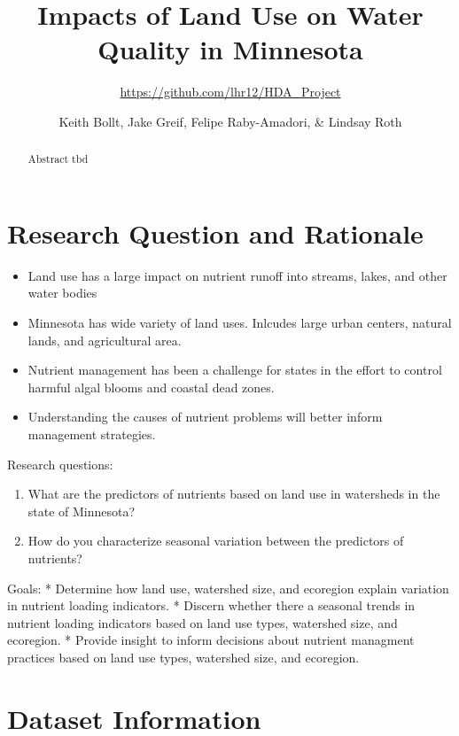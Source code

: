 \documentclass[12pt,]{article}
\title{Impacts of Land Use on Water Quality in Minnesota}
\subtitle{\url{https://github.com/lhr12/HDA_Project}}
\author{Keith Bollt, Jake Greif, Felipe Raby-Amadori, \& Lindsay Roth}
\date{}
\providecommand{\tightlist}{%
  \setlength{\itemsep}{0pt}\setlength{\parskip}{0pt}}
\begin{document}
\maketitle
\begin{abstract}
Abstract tbd
\end{abstract}

\newpage
\tableofcontents 
\newpage
\listoftables 
\newpage
\listoffigures 
\newpage

\hypertarget{research-question-and-rationale}{%
\section{Research Question and
Rationale}\label{research-question-and-rationale}}

\begin{itemize}
\tightlist
\item
  Land use has a large impact on nutrient runoff into streams, lakes,
  and other water bodies
\item
  Minnesota has wide variety of land uses. Inlcudes large urban centers,
  natural lands, and agricultural area.
\item
  Nutrient management has been a challenge for states in the effort to
  control harmful algal blooms and coastal dead zones.
\item
  Understanding the causes of nutrient problems will better inform
  management strategies.
\end{itemize}

Research questions:

\begin{enumerate}
\def\labelenumi{\arabic{enumi}.}
\item
  What are the predictors of nutrients based on land use in watersheds
  in the state of Minnesota?
\item
  How do you characterize seasonal variation between the predictors of
  nutrients?
\end{enumerate}

Goals: * Determine how land use, watershed size, and ecoregion explain
variation in nutrient loading indicators. * Discern whether there a
seasonal trends in nutrient loading indicators based on land use types,
watershed size, and ecoregion. * Provide insight to inform decisions
about nutrient managment practices based on land use types, watershed
size, and ecoregion.

\newpage

\hypertarget{dataset-information}{%
\section{Dataset Information}\label{dataset-information}}
\end{document}
